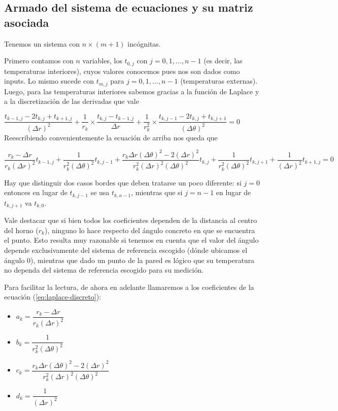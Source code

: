   
\subsection{Armado del sistema de ecuaciones y su matriz asociada}
\label{sec:armado-sistema}
Tenemos un sistema con $n\times(m+1)$ incógnitas.

Primero contamos con $n$ variables, los $t_{0,j}$ con $j = 0,1,\hdots, n-1$ (es decir, las temperaturas interiores), cuyos valores conocemos pues nos son dados como inputs. Lo mismo sucede con $t_{m, j}$ para $j = 0,1,..., n-1$ (temperaturas externas).
Luego, para las temperaturas interiores sabemos gracias a la función de Laplace y a la discretización de las derivadas que vale 

$\dfrac{t_{k-1,j} - 2t_{k,j} + t_{k+1,j}}{(\Delta r)^2} 
+ \dfrac{1}{r_k} \times \dfrac{t_{k,j} - t_{k-1,j}}{\Delta r}
+ \dfrac{1}{r_{k}^2} \times \dfrac{t_{k,j-1} -2t_{k,j} + t_{k,j+1}}{(\Delta \theta)^2} = 0$\\

Reescribiendo convenientemente la ecuación de arriba nos queda que 

\begin{equation}
\label{eq:laplace-discreto}
\dfrac{r_k - \Delta r}{r_k (\Delta r)^2} t_{k-1, j} +
\dfrac{1}{r_k^2(\Delta \theta)^2} t_{k, j-1} +
\dfrac{r_k \Delta r (\Delta \theta)^2 - 2(\Delta r)^2}{r_k^2 (\Delta r)^2 (\Delta \theta)^2} t_{k,j} +
\dfrac{1}{r_k^2(\Delta \theta)^2} t_{k, j+1} +
\dfrac{1}{(\Delta r)^2} t_{k+1,j}  = 0
\end{equation}

Hay que distinguir dos casos bordes que deben tratarse un poco diferente: si $j = 0$ entonces en lugar de $t_{k, j-1}$ se usa $t_{k, n-1}$, mientras que si $j = n-1$ en lugar de $t_{k, j+1}$ va $t_{k, 0}$.

Vale destacar que si bien todos los coeficientes dependen de la distancia al centro del horno ($r_k$), ninguno lo hace respecto del ángulo concreto en que se encuentra el punto. Esto resulta muy razonable si tenemos en cuenta que el valor del ángulo depende exclusivamente del sistema de referencia escogido (dónde ubicamos el ángulo 0), mientras que dado un punto de la pared es lógico que su temperatura no dependa del sistema de referencia escogido para su medición.

Para facilitar la lectura, de ahora en adelante llamaremos a los coeficientes de la ecuación (\ref{eq:laplace-discreto}): 
\begin{itemize}
\item $a_k = \dfrac{r_k - \Delta r}{r_k (\Delta r)^2}$ 
\item $b_k = \dfrac{1}{r_k^2(\Delta \theta)^2}$ 
\item $c_k = \dfrac{r_k \Delta r (\Delta \theta)^2 - 2(\Delta r)^2}{r_k^2 (\Delta r)^2 (\Delta \theta)^2}$ 
\item $d_k = \dfrac{1}{(\Delta r)^2}$
\end{itemize}

